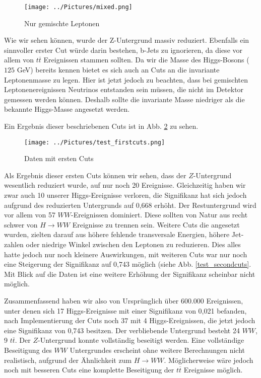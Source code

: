 \begin{figure}[h]
\texttt{[image: ../Pictures/mixed.png]}
\caption{Nur gemischte Leptonen \cite{opendata}}
\label{mixed}
\end{figure}

\clearpage

Wie wir sehen können, wurde der Z-Untergrund massiv reduziert.
Ebenfalls ein sinnvoller erster Cut würde darin bestehen, b-Jets zu ignorieren, da diese vor allem von $t\overline{t}$ Ereignissen stammen sollten.
Da wir die Masse des Higgs-Bosons ($125$ GeV) bereits kennen bietet es sich auch an Cuts an die invariante Leptonenmasse zu legen.
Hier ist jetzt jedoch zu beachten, dass bei gemischten Leptonenereignissen Neutrinos entstanden sein müssen, die nicht im Detektor gemessen werden können.
Deshalb sollte die invariante Masse niedriger als die bekannte Higgs-Masse angesetzt werden.

Ein Ergebnis dieser beschriebenen Cuts ist in Abb. \ref{test_firstcuts} zu sehen.

\begin{figure}[h]
\texttt{[image: ../Pictures/test\_firstcuts.png]}
\caption{Daten mit ersten Cuts \cite{opendata}}
\label{test_firstcuts}
\end{figure}

Als Ergebnis dieser ersten Cuts können wir sehen, dass der $Z$-Untergrund wesentlich reduziert wurde, auf nur noch 20 Ereignisse.
Gleichzeitig haben wir zwar auch 10 unserer Higgs-Ereignisse verloren, die Signifikanz hat sich jedoch aufgrund des reduzierten Untergrunds auf 0,668 erhöht.
Der Restuntergrund wird vor allem von 57 $WW$-Ereignissen dominiert.
Diese sollten von Natur aus recht schwer von $H \rightarrow WW$ Ereignisse zu trennen sein.
Weitere Cuts die angesetzt wurden, zielten darauf aus höhere fehlende transversale Energien, höhere Jet-zahlen oder niedrige Winkel zwischen den Leptonen zu reduzieren.
Dies alles hatte jedoch nur noch kleinere Auswirkungen, mit weiteren Cuts war nur noch eine Steigerung der Signifikanz auf 0,743 möglich (siehe Abb. \ref{test_secondcuts}.
Mit Blick auf die Daten ist eine weitere Erhöhung der Signifikanz scheinbar nicht möglich.

Zusammenfassend haben wir also von Ursprünglich über 600.000 Ereignissen, unter denen sich 17 Higgs-Ereignisse mit einer Signifikanz von 0,021 befanden, nach Implementierung der Cuts noch 37 mit 4 Higgs-Ereignissen, die jetzt jedoch eine Signifikanz von 0,743 besitzen.
Der verbliebende Untergrund besteht 24 $WW$, 9 $t\overline{t}$.
Der $Z$-Untergrund konnte vollständig beseitigt werden.
Eine vollständige Beseitigung des $WW$ Untergrundes erscheint ohne weitere Berechnungen nicht realistisch, aufgrund der Ähnlichkeit zum $H \rightarrow WW$.
Möglicherweise wäre jedoch noch mit besseren Cuts eine komplette Beseitigung der $t\overline{t}$ Ereignisse möglich.


